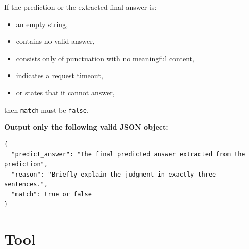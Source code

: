 \documentclass{huawei}
\begin{document}
\begin{tcolorbox}[
    title={Evaluation Prompt},
    colback=gray!5,
    colframe=gray!70,
    boxrule=0.5pt,
    arc=2mm,
    left=2mm,
    right=2mm,
    top=1mm,
    bottom=1mm,
    breakable
]
If the prediction or the extracted final answer is:
\begin{itemize}
    \item an empty string,
    \item contains no valid answer,
    \item consists only of punctuation with no meaningful content,
    \item indicates a request timeout,
    \item or states that it cannot answer,
\end{itemize}

then \texttt{match} must be \texttt{false}.

\textbf{Output only the following valid JSON object:}

\begin{verbatim}
{
  "predict_answer": "The final predicted answer extracted from the prediction",
  "reason": "Briefly explain the judgment in exactly three sentences.",
  "match": true or false
}
\end{verbatim}

\end{tcolorbox}





\section{Tool}
\end{document}
